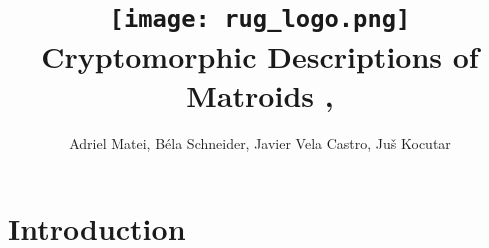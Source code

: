 \documentclass{article}
\title{ {\texttt{[image: rug\_logo.png]}}\\
    \vspace{2cm}
    {Cryptomorphic Descriptions of Matroids} ,
    }
\author{Adriel Matei, Béla Schneider, Javier Vela Castro, Juš Kocutar}
\theoremstyle{plain}
\theoremstyle{definition}
\theoremstyle{remark}
\numberwithin{equation}{section}
\begin{document}
\maketitle


\newpage

\tableofcontents

\newpage
\section{Introduction}












\begin{appendices}
    \renewcommand{\thesection}{\Alph{section} ---}


    
    
\end{appendices}

\nocite{*}


\end{document}
